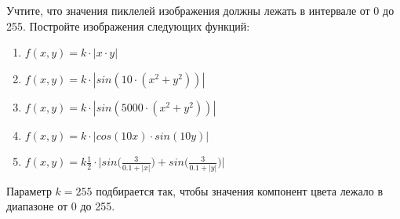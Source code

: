 \documentclass{article}
\begin{document}
\begin{itemize}
Учтите, что значения пиклелей изображения должны лежать в интервале от 0 до 255. Постройте изображения следующих функций: 
\begin{enumerate}
\item $f(x, y) = k\cdot|x \cdot y|$
\item $f(x, y) = k\cdot|sin(10\cdot(x^2 + y^2))|$
\item $f(x, y) = k\cdot|sin(5000\cdot(x^2 + y^2))|$
\item $f(x, y) = k\cdot|cos(10x)\cdot sin(10y)|$
\item $f(x, y) = k\frac{1}{2}\cdot\Big|sin\Big(\frac{3}{0.1 + |x|}\Big) + sin\Big(\frac{3}{0.1 + |y|}\Big)\Big|$
\end{enumerate}
Параметр $k = 255$ подбирается так, чтобы значения компонент цвета лежало в диапазоне от 0 до 255.
\end{itemize}
\newpage
\end{document}
